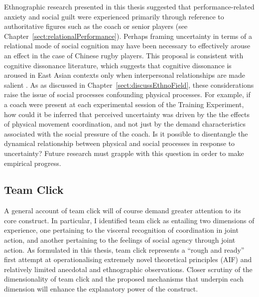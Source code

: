Ethnographic research presented in this thesis suggested that performance-related anxiety and social guilt were experienced primarily through reference to authoritative figures such as the coach or senior players (see Chapter~\ref{sect:relationalPerformance}).  Perhaps framing uncertainty in terms of a relational mode of social cognition may have been necessary to effectively arouse an effect in the case of Chinese rugby players.  This proposal is consistent with cognitive dissonance literature, which suggests that cognitive dissonance is aroused in East Asian contexts only when interpersonal relationships are made salient \citep{Hoshino-Browne2005}.   As as discussed in Chapter~\ref{sect:discussEthnoField}, these considerations raise the issue of social processes confounding physical processes.  For example, if a coach were present at each experimental session of the Training Experiment, how could it be inferred that perceived uncertainty was driven by the the effects of physical movement coordination, and not just by the demand characteristics associated with the social pressure of the coach.  Is it possible to disentangle the dynamical relationship between physical and social processes in response to uncertainty?  Future research must grapple with this question in order to make empirical progress.



\subsection{Team Click}
A general account of team click will of course demand greater attention to its core construct.  In particular,  I identified team click as entailing two dimensions of experience, one pertaining to the visceral recognition of coordination in joint action, and another pertaining to the feelings of social agency through joint action. As formulated in this thesis, team click represents a ``rough and ready'' first attempt at operationalising extremely novel theoretical principles (AIF) and relatively limited anecdotal and ethnographic observations. Closer scrutiny of the dimensionality of team click and the proposed mechanisms that underpin each dimension will enhance the explanatory power of the construct.

